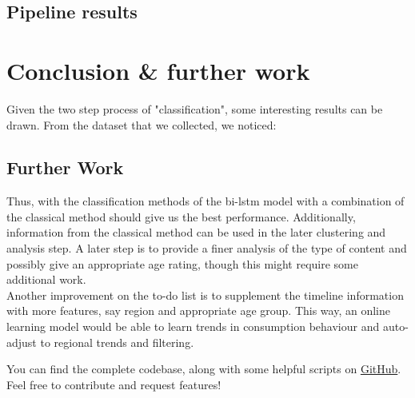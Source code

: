 \documentclass{article}[A4]
\begin{document}
\subsection{Pipeline results}

\section{Conclusion \& further work}

Given the two step process of "classification", some interesting results can be drawn. From the dataset that we collected, we noticed:

\subsection{Further Work}

Thus, with the classification methods of the bi-lstm model with a combination of the classical method should give us the best performance. Additionally, information from the classical method can be used in the later clustering and analysis step. A later step is to provide a finer analysis of the type of content and possibly give an appropriate age rating, though this might require some additional work. \\

Another improvement on the to-do list is to supplement the timeline information with more features, say region and appropriate age group. This way, an online learning model would be able to learn trends in consumption behaviour and auto-adjust to regional trends and filtering.

You can find the complete codebase, along with some helpful scripts on \href{https://github.com/Pk13055/transcript-based-classification}{GitHub}. Feel free to contribute and request features!



\end{document}
